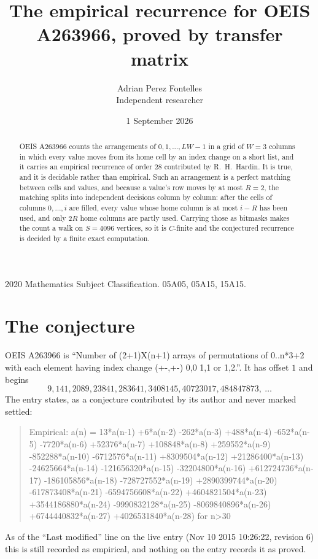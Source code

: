 \documentclass[11pt,a4paper]{article}
\title{The empirical recurrence for OEIS A263966, proved by transfer matrix}
\author{Adrian Perez Fontelles\\ \small Independent researcher}
\date{1 September 2026}
\theoremstyle{plain}
\theoremstyle{definition}
\begin{document}
\maketitle

\begin{abstract}
OEIS A263966 counts the arrangements of $0,1,\dots,LW-1$ in a grid of $W=3$ columns in which
every value moves from its home cell by an index change on a short list, and it carries an
empirical recurrence of order $28$ contributed by R.~H.~Hardin. It is true, and it is
decidable rather than empirical. Such an arrangement is a perfect matching between cells and
values, and because a value's row moves by at most $R=2$, the matching splits into
independent decisions column by column: after the cells of columns $0,\dots,i$ are filled,
every value whose home column is at most $i-R$ has been used, and only $2R$ home columns are
partly used. Carrying those as bitmasks makes the count a walk on $S=4096$ vertices, so it is
$C$-finite and the conjectured recurrence is decided by a finite exact computation.
\end{abstract}

\noindent\small 2020 Mathematics Subject Classification. 05A05, 05A15, 15A15.\normalsize

\section{The conjecture}

OEIS A263966 is ``Number of (2+1)X(n+1) arrays of permutations of 0..n*3+2 with each element having index change (+-,+-) 0,0 1,1 or 1,2.''. It has offset $1$ and begins
\[
9, 141, 2089, 23841, 283641, 3408145, 40723017, 484847873,\ \dots
\]
The entry states, as a conjecture contributed by its author and never marked settled:
\begin{quote}
Empirical: a(n) = 13*a(n-1) +6*a(n-2) -262*a(n-3) +488*a(n-4) -652*a(n-5) -7720*a(n-6) +52376*a(n-7) +108848*a(n-8) +259552*a(n-9) -852288*a(n-10) -6712576*a(n-11) +8309504*a(n-12) +21286400*a(n-13) -24625664*a(n-14) -121656320*a(n-15) -32204800*a(n-16) +612724736*a(n-17) -186105856*a(n-18) -728727552*a(n-19) +2890399744*a(n-20) -617873408*a(n-21) -6594756608*a(n-22) +4604821504*a(n-23) +3544186880*a(n-24) -9990832128*a(n-25) -8069840896*a(n-26) +6744440832*a(n-27) +4026531840*a(n-28) for n>30
\end{quote}
As of the ``Last modified'' line on the live entry (Nov 10 2015 10:26:22, revision 6) this is still
recorded as empirical, and nothing on the entry records it as proved.
\end{document}
